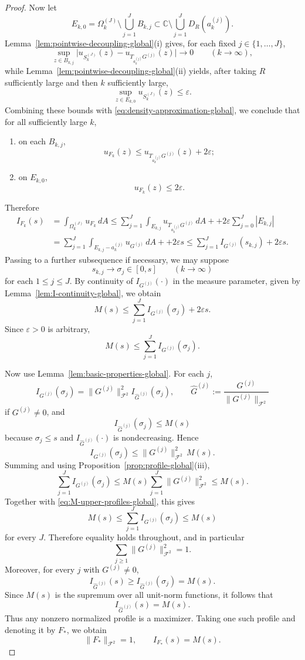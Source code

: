 \documentclass[a4paper,11pt,reqno]{amsart}
\numberwithin{equation}{section}
\theoremstyle{plain} %
\theoremstyle{definition} %
\theoremstyle{remark}
\newcommand{\C}{\mathbb{C}}
\begin{document}
\begin{proof}
Now let
\[
E_{k,0}
=
\Omega_k^{(J)}\setminus \bigcup_{j=1}^J B_{k,j}
\subset
\C\setminus \bigcup_{j=1}^J D_R(a_k^{(j)}).
\]
Lemma~\ref{lem:pointwise-decoupling-global}(i) gives, for each fixed
\(j\in\{1,\dots,J\}\),
\[
\sup_{z\in B_{k,j}}
\big|u_{S_k^{(J)}}(z)-u_{T_{a_k^{(j)}}G^{(j)}}(z)\big|\to 0
\qquad (k\to\infty),
\]
while Lemma~\ref{lem:pointwise-decoupling-global}(ii) yields, after taking \(R\)
sufficiently large and then \(k\) sufficiently large,
\[
\sup_{z\in E_{k,0}}u_{S_k^{(J)}}(z)\le \varepsilon.
\]
Combining these bounds with \eqref{eq:density-approximation-global}, we conclude
that for all sufficiently large \(k\),
\begin{enumerate}
\item[(a)] on each \(B_{k,j}\),
\[
u_{F_k}(z)\le u_{T_{a_k^{(j)}}G^{(j)}}(z)+2\varepsilon;
\]
\item[(b)] on \(E_{k,0}\),
\[
u_{F_k}(z)\le 2\varepsilon.
\]
\end{enumerate}

Therefore
\begin{align*}
I_{F_k}(s)
&= 
\int_{\Omega_k^{(J)}} u_{F_k}\,dA \le
\sum_{j=1}^J \int_{E_{k,j}} u_{T_{a_k^{(j)}}G^{(j)}}\,dA
+
+2\varepsilon \sum_{j=0}^J |E_{k,j}| \\
&=
\sum_{j=1}^J \int_{E_{k,j}-a_k^{(j)}} u_{G^{(j)}}\,dA
+
+2\varepsilon s \le
\sum_{j=1}^J I_{G^{(j)}}(s_{k,j})
+2\varepsilon s.
\end{align*}
Passing to a further subsequence if necessary, we may suppose
\[
s_{k,j}\to \sigma_j\in [0,s]
\qquad (k\to\infty)
\]
for each \(1\le j\le J\). By continuity of \(I_{G^{(j)}}(\cdot)\) in the measure
parameter, given by Lemma~\ref{lem:I-continuity-global}, we obtain
\[
M(s)\le \sum_{j=1}^J I_{G^{(j)}}(\sigma_j)+2\varepsilon s.
\]
Since \(\varepsilon>0\) is arbitrary,
\begin{equation}\label{eq:M-upper-profiles-global}
M(s)\le \sum_{j=1}^J I_{G^{(j)}}(\sigma_j).
\end{equation}

Now use Lemma~\ref{lem:basic-properties-global}. For each \(j\),
\[
I_{G^{(j)}}(\sigma_j)
=
\|G^{(j)}\|_{\mathcal F^2}^2
I_{\widehat G^{(j)}}(\sigma_j),
\qquad
\widehat G^{(j)}:=\frac{G^{(j)}}{\|G^{(j)}\|_{\mathcal F^2}}
\]
if \(G^{(j)}\neq 0\), and
\[
I_{\widehat G^{(j)}}(\sigma_j)\le M(s)
\]
because \(\sigma_j\le s\) and \(I_{\widehat G^{(j)}}(\cdot)\) is nondecreasing. Hence
\[
I_{G^{(j)}}(\sigma_j)\le \|G^{(j)}\|_{\mathcal F^2}^2\, M(s).
\]
Summing and using Proposition~\ref{prop:profile-global}(iii),
\[
\sum_{j=1}^J I_{G^{(j)}}(\sigma_j)
\le
M(s)\sum_{j=1}^J \|G^{(j)}\|_{\mathcal F^2}^2
\le M(s).
\]
Together with \eqref{eq:M-upper-profiles-global}, this gives
\[
M(s)\le \sum_{j=1}^J I_{G^{(j)}}(\sigma_j)\le M(s)
\]
for every \(J\). Therefore equality holds throughout, and in particular
\[
\sum_{j\ge 1}\|G^{(j)}\|_{\mathcal F^2}^2=1.
\]
Moreover, for every \(j\) with \(G^{(j)}\neq 0\),
\[
I_{\widehat G^{(j)}}(s)\ge I_{\widehat G^{(j)}}(\sigma_j)=M(s).
\]
Since \(M(s)\) is the supremum over all unit-norm functions, it follows that
\[
I_{\widehat G^{(j)}}(s)=M(s).
\]
Thus any nonzero normalized profile is a maximizer. Taking one such profile and
denoting it by \(F_*\), we obtain
\[
\|F_*\|_{\mathcal F^2}=1,
\qquad
I_{F_*}(s)=M(s).
\]


\end{proof}
\end{document}
